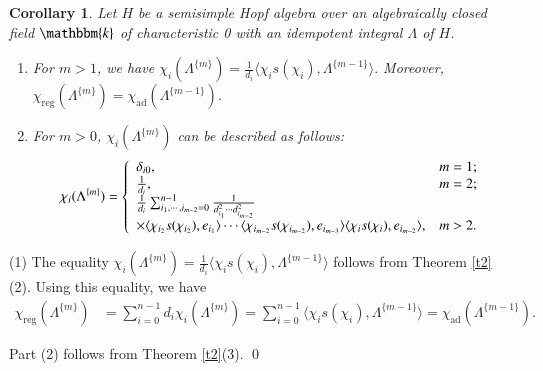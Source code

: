 \documentclass[11pt]{amsart}
\newtheorem{cor}[thm]{Corollary}
\numberwithin{equation}{section}
\begin{document}
\begin{cor}\label{c1}
Let $H$ be a semisimple Hopf algebra over an algebraically closed field $\mathbbm{k}$ of characteristic 0 with an idempotent integral $\Lambda$ of $H$. 
\begin{enumerate}
\item For $m>1$, we have $\chi_i(\Lambda^{\{m\}})=\frac{1}{d_i}\langle\chi_is(\chi_i),\Lambda^{\{m-1\}}\rangle.$ Moreover, $\chi_{\operatorname{reg}}(\Lambda^{\{m\}})=\chi_{\operatorname{ad}}(\Lambda^{\{m-1\}})$.
\item For $m>0$, $\chi_i(\Lambda^{\{m\}})$ can be described as follows:
$$\chi_i(\Lambda^{\{m\}})=\left\{
    \begin{array}{ll}
      \delta_{i0}, & \hbox{$m=1$;} \\
      \frac{1}{d_i}, & \hbox{$m=2$;} \\
       \frac{1}{d_i}\sum_{i_1,\cdots,i_{m-2}=0}^{n-1}\frac{1}{d^2_{i_1}\cdots d^2_{i_{m-2}}}\\ \times\langle\chi_{i_2}s(\chi_{i_2}),e_{i_1}\rangle\cdots \langle\chi_{i_{m-2}}s(\chi_{i_{m-2}}),e_{i_{m-3}}\rangle\langle\chi_{i}s(\chi_{i}),e_{i_{m-2}}\rangle , & \hbox{$m>2$.}
    \end{array}
  \right.
$$
\end{enumerate}
\end{cor}
\proof
(1) The equality  $\chi_i(\Lambda^{\{m\}})=\frac{1}{d_i}\langle\chi_is(\chi_i),\Lambda^{\{m-1\}}\rangle$ follows from Theorem \ref{t2}(2). Using this equality, we have
\begin{align*}
\chi_{\operatorname{reg}}(\Lambda^{\{m\}})&=\sum_{i=0}^{n-1}d_i\chi_i(\Lambda^{\{m\}})=\sum_{i=0}^{n-1}\langle\chi_is(\chi_i),\Lambda^{\{m-1\}}\rangle=\chi_{\operatorname{ad}}(\Lambda^{\{m-1\}}).
\end{align*}

Part (2) follows from Theorem \ref{t2}(3).
\qed
\end{document}
